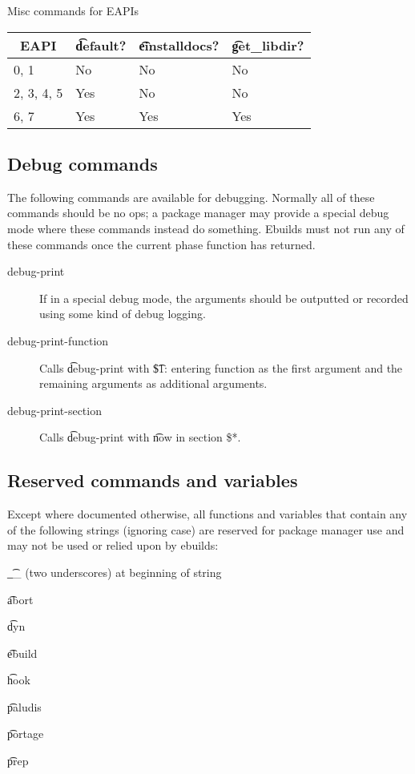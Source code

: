 \begin{centertable}{Misc commands for EAPIs}
    \label{tab:misc-commands}
    \begin{tabular}{llll}
      \toprule
      \multicolumn{1}{c}{\textbf{EAPI}} &
      \multicolumn{1}{c}{\textbf{\t{default}?}} &
      \multicolumn{1}{c}{\textbf{\t{einstalldocs}?}} &
      \multicolumn{1}{c}{\textbf{\t{get_libdir}?}} \\
      \midrule
      0, 1              & No  & No  & No  \\
      2, 3, 4, 5        & Yes & No  & No  \\
      6, 7              & Yes & Yes & Yes \\
      \bottomrule
    \end{tabular}
\end{centertable}

\subsection{Debug commands}
The following commands are available for debugging. Normally all of these commands should be no ops;
a package manager may provide a special debug mode where these commands instead do something.
Ebuilds must not run any of these commands once the current phase function has returned.

\begin{description}
\item[debug-print] If in a special debug mode, the arguments should be outputted or recorded using
    some kind of debug logging.
\item[debug-print-function] Calls \t{debug-print} with \t{\$1: entering function} as the first
    argument and the remaining arguments as additional arguments.
\item[debug-print-section] Calls \t{debug-print} with \t{now in section \$*}.
\end{description}

\subsection{Reserved commands and variables}

Except where documented otherwise, all functions and variables that contain any of the following
strings (ignoring case) are reserved for package manager use and may not be used or relied upon by
ebuilds:

\begin{compactitem}
\item \t{__} (two underscores) at beginning of string
\item \t{abort}
\item \t{dyn}
\item \t{ebuild}
\item \t{hook}
\item \t{paludis}
\item \t{portage}
\item \t{prep}
\end{compactitem}


